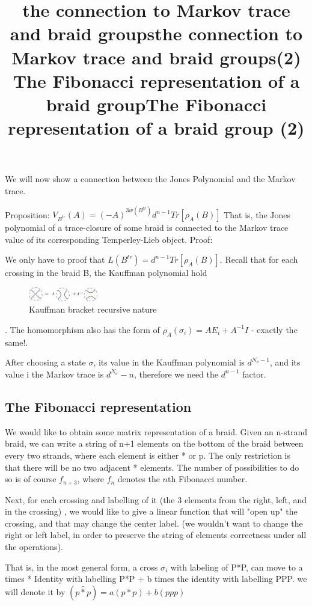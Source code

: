 \documentclass{article}
\begin{document}
\title{the connection to Markov trace and braid groups}
We will now show a connection between the Jones Polynomial and the Markov trace.

Proposition:
$V_{B^{tr}}(A) = (-A)^{3w(B^{tr})}d^{n-1}Tr[\rho_{A}(B)]$
That is, the Jones polynomial of a trace-closure of some braid is connected to the Markov trace value of its corresponding Temperley-Lieb object.
Proof:

We only have to proof that $L(B^{tr}) = d^{n-1}Tr[\rho_{A}(B)]$. Recall that for each crossing in the braid B, the Kauffman polynomial hold \begin{figure}
\includegraphics[scale=1]{Kauffman_bracket_identity} 
\caption{Kauffman bracket recursive nature}
\end{figure}.
The homomorphism also has the form of  $\rho_{A}(\sigma_{i}) = AE_{i} +A^{-1}I$ - exactly the same!.

\title{the connection to Markov trace and braid groups(2) }
After choosing a state $\sigma$, its value in the Kauffman polynomial is $d^{N_{\sigma} -1}$, and its
value i the Markov trace is $d^{N_{\sigma}} -n$, therefore we need the $d^{n-1}$ factor. 
 

\subsection{The Fibonacci representation}
\title{The Fibonacci representation of a braid group}
We would like to obtain some matrix representation of a braid. Given an n-strand braid, we can write a string of n+1 elements on the bottom of the braid between every two strands, where each element is either * or p. The only restriction is that there will be no two adjacent * elements. The number of possibilities to do so is of course $f_{n+3}$, where $f_{n}$ denotes the $n$th Fibonacci number.

Next, for each crossing and labelling of it (the 3 elements from the right, left, and in the crossing) , we would like to give a linear function that will "open up" the crossing, and that may change the center label. (we wouldn't want to change the right or left label, in order to preserve the string of elements correctness under all the operations).
 

\title{The Fibonacci representation of a braid group (2)}
That is, in the most general form, a cross $\sigma_{i}$ with labeling of P*P, can move to 
a times * Identity with labelling P*P + b times the identity with labelling PPP.
we will denote it by $(p\hat{*}p)=a(p*p)+b(ppp)$
\end{document}
